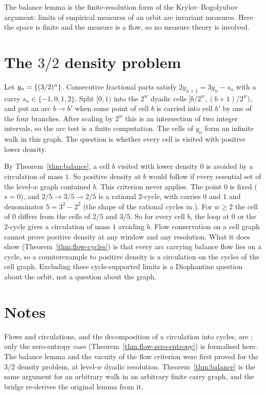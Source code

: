 The balance lemma is the finite-resolution form of the Krylov--Bogolyubov argument: limits of
empirical measures of an orbit are invariant measures. Here the space is finite and the measure
is a flow, so no measure theory is involved.

\section{The \texorpdfstring{\(3/2\)}{3/2} density problem}

Let \(y_n=\{(3/2)^n\}\). Consecutive fractional parts satisfy \(2y_{n+1}=3y_n-s_n\) with a
carry \(s_n\in\{-1,0,1,2\}\). Split \([0,1)\) into the \(2^w\) dyadic cells
\([b/2^w,(b+1)/2^w)\), and put an arc \(b\to b'\) when some point of cell \(b\) is carried into
cell \(b'\) by one of the four branches. After scaling by \(2^w\) this is an intersection of two
integer intervals, so the arc test is a finite computation. The cells of \(y_n\) form an
infinite walk in this graph. The question is whether every cell is visited with positive lower
density.

By Theorem~\ref{thm:balance}, a cell \(b\) visited with lower density \(0\) is avoided by a
circulation of mass \(1\). So positive density at \(b\) would follow if every essential set of
the level-\(w\) graph contained \(b\). This criterion never applies. The point \(0\) is fixed
(\(s=0\)), and \(2/5\to3/5\to2/5\) is a rational \(2\)-cycle, with carries \(0\) and \(1\) and
denominator \(5=3^2-2^2\) (the shape of the rational cycles in \cite{Lag90}). For \(w\ge2\) the
cell of \(0\) differs from the cells of \(2/5\) and \(3/5\). So for every cell \(b\), the loop at
\(0\) or the \(2\)-cycle gives a circulation of mass \(1\) avoiding \(b\). Flow conservation on
a cell graph cannot prove positive density at any window and any resolution. What it does show
(Theorem~\ref{thm:flow-cycles}) is that every arc carrying balance flow lies on a cycle, so a
counterexample to positive density is a circulation on the cycles of the cell graph. Excluding
these cycle-supported limits is a Diophantine question about the orbit, not a question about the
graph.

\section*{Notes}
Flows and circulations, and the decomposition of a circulation into cycles, are
\cite[ch.~3]{BJG09}; only the zero-entropy case (Theorem~\ref{thm:flow-zero-entropy}) is
formalised here. The balance lemma and the vacuity of the flow criterion were first proved for
the \(3/2\) density problem, at level-\(w\) dyadic resolution. Theorem~\ref{thm:balance} is the
same argument for an arbitrary walk in an arbitrary finite carry graph, and the bridge
re-derives the original lemma from it.

